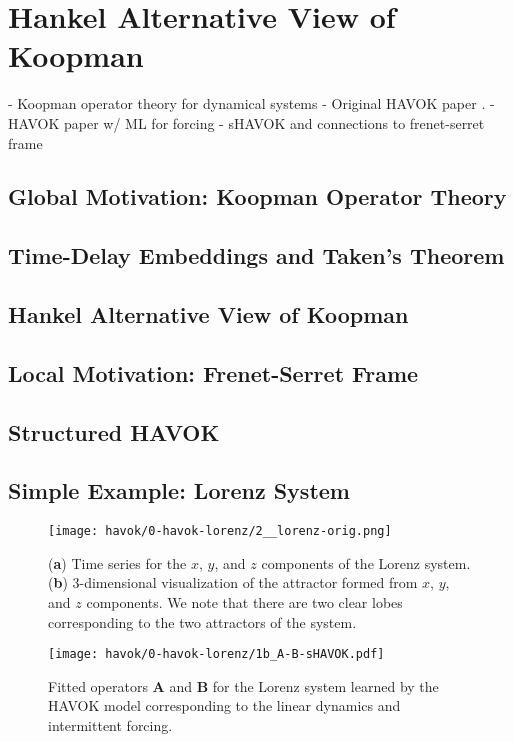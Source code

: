 \section{Hankel Alternative View of Koopman}


- Koopman operator theory for dynamical systems \cite{brunton-koopman-theory}
- Original HAVOK paper \cite{brunton-havok-orig}.
- HAVOK paper w/ ML for forcing \cite{havok-ml}
- sHAVOK and connections to frenet-serret frame \cite{havok-diffgeo}


\subsection{Global Motivation: Koopman Operator Theory}

\subsection{Time-Delay Embeddings and Taken's Theorem}
\subsection{Hankel Alternative View of Koopman}
\subsection{Local Motivation: Frenet-Serret Frame}
\subsection{Structured HAVOK}
\subsection{Simple Example: Lorenz System}


\begin{figure}[h]
  \centering
  \texttt{[image: havok/0-havok-lorenz/2\_\_lorenz-orig.png]}
  \caption{(\textbf{a}) Time series for the $x$, $y$, and $z$ components of the
    Lorenz system. (\textbf{b}) 3-dimensional visualization of the attractor
    formed from $x$, $y$, and $z$ components. We note that there are two clear
    lobes corresponding to the two attractors of the system.}
  \label{fig:lorenz-time-series-orig}
\end{figure}


\begin{figure}[h]
  \centering
  \texttt{[image: havok/0-havok-lorenz/1b\_A-B-sHAVOK.pdf]}
  \caption{Fitted operators $\mathbf{A}$ and $\mathbf{B}$ for the Lorenz system
    learned by the HAVOK model corresponding to the linear dynamics and
    intermittent forcing.}
  \label{fig:lorenz-A-B-heatmap}
\end{figure}


